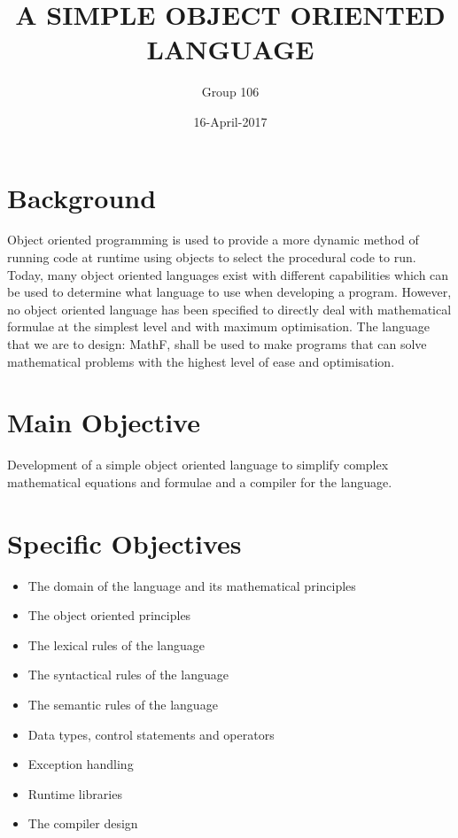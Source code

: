 \documentclass{article}
\begin{document}
\title{A SIMPLE OBJECT ORIENTED LANGUAGE}
\date{16-April-2017}

\author{Group 106}


\maketitle
\newpage

\section{Background}
Object oriented programming is used to provide a more dynamic method of running code at runtime using objects to select the procedural code to run. Today, many object oriented languages exist with different capabilities which can be used to determine what language to use when developing a program. However, no object oriented language has been specified to directly deal with mathematical formulae at the simplest level and with maximum optimisation. The language that we are to design: MathF, shall be used to make programs that can solve mathematical problems with the highest level of ease and optimisation.

\section{Main Objective}
Development of a simple object oriented language to simplify complex mathematical equations and formulae and a compiler for the language.

\section{Specific Objectives}
\begin{itemize}
\item
The domain of the language and its mathematical principles
\item
The object oriented principles
\item
The lexical rules of the language
\item
The syntactical rules of the language
\item
The semantic rules of the language
\item
Data types, control statements and operators
\item
Exception handling
\item
Runtime libraries
\item
The compiler design
\end{itemize}
\end{document}
